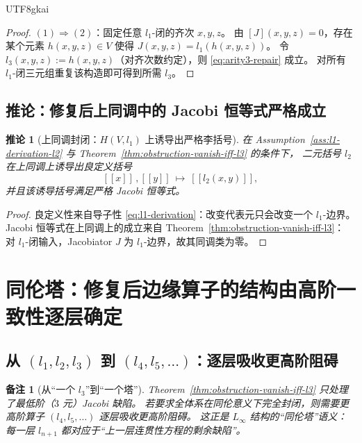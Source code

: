 \documentclass[12pt]{article}
\newtheorem{corollary}{推论}[section]
\newtheorem{remark}{备注}[section]
\begin{document}
\begin{CJK*}{UTF8}{gkai}
\begin{proof}
$(1)\Rightarrow(2)$：固定任意 $l_1$-闭的齐次 $x,y,z$。
由 $[J](x,y,z)=0$，存在某个元素 $h(x,y,z)\in V$ 使得 $J(x,y,z)=l_1(h(x,y,z))$。
令 $l_3(x,y,z):=h(x,y,z)$（对齐次数约定），则 \eqref{eq:arity3-repair} 成立。
对所有 $l_1$-闭三元组重复该构造即可得到所需 $l_3$。
\end{proof}

\subsection{推论：修复后上同调中的 Jacobi 恒等式严格成立}

\begin{corollary}[上同调封闭：$H(V,l_1)$ 上诱导出严格李括号]
\label{cor:cohomology-lie-bracket}
在 Assumption~\ref{ass:l1-derivation-l2} 与 Theorem~\ref{thm:obstruction-vanish-iff-l3} 的条件下，
二元括号 $l_2$ 在上同调上诱导出良定义括号
\[
  [\![x]\!]\,,[\![y]\!]\ \longmapsto\ [\![l_2(x,y)]\!],
\]
并且该诱导括号满足严格 Jacobi 恒等式。
\end{corollary}

\begin{proof}
良定义性来自导子性 \eqref{eq:l1-derivation}：改变代表元只会改变一个 $l_1$-边界。
Jacobi 恒等式在上同调上的成立来自 Theorem~\ref{thm:obstruction-vanish-iff-l3}：
对 $l_1$-闭输入，Jacobiator $J$ 为 $l_1$-边界，故其同调类为零。
\end{proof}

\section{同伦塔：修复后边缘算子的结构由高阶一致性逐层确定}

\subsection{从 $(l_1,l_2,l_3)$ 到 $(l_4,l_5,\dots)$：逐层吸收更高阶阻碍}

\begin{remark}[从“一个 $l_3$”到“一个塔”]
Theorem~\ref{thm:obstruction-vanish-iff-l3} 只处理了最低阶（$3$ 元）Jacobi 缺陷。
若要求全体系在同伦意义下完全封闭，则需要更高阶算子 $(l_4,l_5,\dots)$ 逐层吸收更高阶阻碍。
这正是 $L_\infty$ 结构的“同伦塔”语义：每一层 $l_{n+1}$ 都对应于“上一层连贯性方程的剩余缺陷”。
\end{remark}


\end{CJK*}
\end{document}
